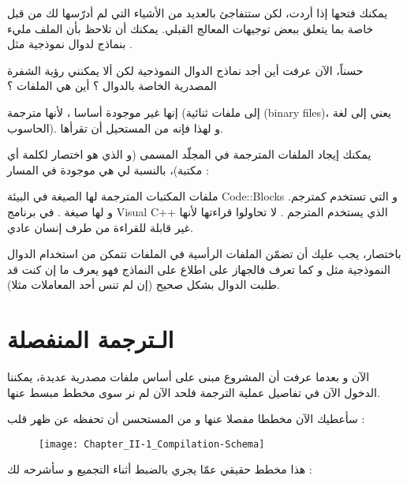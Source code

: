 يمكنك فتحها إذا أردت، لكن ستتفاجئ بالعديد من الأشياء التي لم أدرّسها لك من قبل خاصة بما يتعلق ببعض توجيهات المعالج القبلي. يمكنك أن تلاحظ بأن الملف مليء بنماذج لدوال نموذجية مثل
.

\begin{question}
  حسناً، الآن عرفت أين أجد نماذج الدوال النموذجية لكن ألا يمكنني رؤية الشفرة المصدرية الخاصة بالدوال ؟ أين هي الملفات
؟
\end{question}

إنها غير موجودة أساسا ، لأنها مترجمة (إلى ملفات ثنائية
(\textenglish{binary files})،
يعني إلى لغة الحاسوب). و لهذا فإنه من المستحيل أن تقرأها.

يمكنك إيجاد الملفات المترجمة في المجلّد المسمى
(و الذي هو اختصار لكلمة
أي مكتبة)، بالنسبة لي هي موجودة في المسار :


ملفات المكتبات المترجمة لها الصيغة
في البيئة
\textenglish{Code::Blocks}
و التي تستخدم
كمترجم. و لها صيغة
.
في برنامج
\textenglish{Visual C++}
الذي يستخدم المترجم
.
لا تحاولوا قراءتها لأنها غير قابلة للقراءة من طرف إنسان عادي.

باختصار، يجب عليك أن تضمّن الملفات الرأسية
في الملفات
تتمكن من استخدام الدوال النموذجية مثل
و كما تعرف فالجهاز على اطلاع على النماذج فهو يعرف ما إن كنت قد طلبت الدوال بشكل صحيح (إن لم تنس أحد المعاملات مثلا).

\section{الـترجمة المنفصلة}

الآن و بعدما عرفت أن المشروع مبنى على أساس ملفات مصدرية عديدة، يمكننا الدخول الآن في تفاصيل عملية الترجمة فلحد الآن لم نر سوى مخطط مبسط عنها.

سأعطيك الآن مخططا مفصلا عنها و من المستحسن أن تحفظه عن ظهر قلب :

\begin{figure}[H]
	\centering
	\texttt{[image: Chapter\_II-1\_Compilation-Schema]}
\end{figure}

هذا مخطط حقيقي عمّا يجري بالضبط أثناء التجميع و سأشرحه لك :

